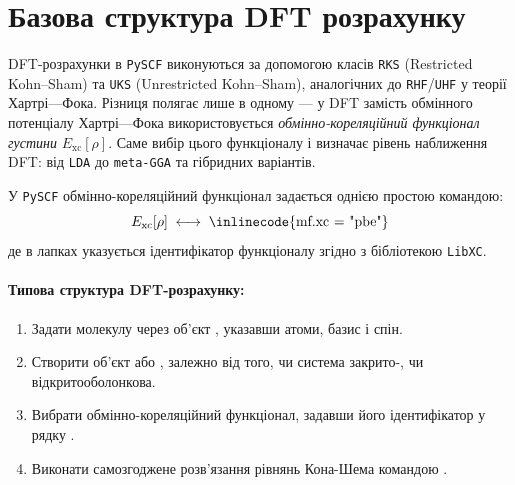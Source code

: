 
\section{Базова структура DFT розрахунку}

DFT-розрахунки в \texttt{PySCF} виконуються за допомогою класів
\texttt{RKS} (Res\-tric\-ted Kohn--Sham) та \texttt{UKS} (Unrestricted Kohn--Sham),
аналогічних до \texttt{RHF}/\texttt{UHF} у теорії Хартрі---Фока.
Різниця полягає лише в одному --- у DFT замість обмінного потенціалу Хартрі---Фока
використовується \textit{обмінно-кореляційний функціонал густини} $E_{\text{xc}}[\rho]$.
Саме вибір цього функціоналу і визначає рівень наближення DFT: від \texttt{LDA} до \texttt{meta-GGA} та гібридних варіантів.

У \texttt{PySCF} обмінно-кореляційний функціонал задається однією простою командою:
\[
E_{\text{xc}}[\rho] \;\longleftrightarrow\; \text{\inlinecode{mf.xc = "pbe"}}
\]
де в лапках указується ідентифікатор функціоналу згідно з бібліотекою \texttt{LibXC}.

\paragraph{Типова структура DFT-розрахунку:}
\begin{enumerate}
    \item Задати молекулу через об’єкт , указавши атоми, базис і спін.
    \item Створити об’єкт  або , залежно від того, чи система закрито-, чи відкритооболонкова.
    \item Вибрати обмінно-кореляційний функціонал, задавши його ідентифікатор у рядку
    .
    \item Виконати самозгоджене розв’язання рівнянь Кона-Шема командою .
\end{enumerate}

